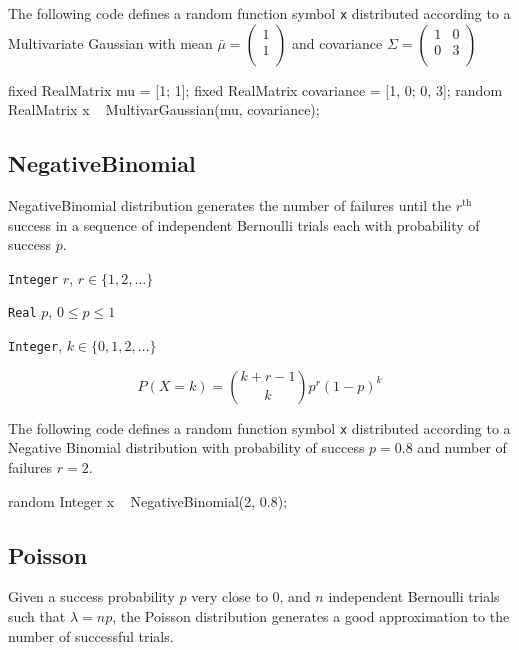 The following code defines a random function symbol \verb|x| distributed according to a Multivariate Gaussian with mean $\bar{\mu} = 
\begin{pmatrix}
  1  \\
  1  \\ 
 \end{pmatrix}$ and covariance $\Sigma = 
 \begin{pmatrix}
   1 & 0 \\
   0 & 3 \\
  \end{pmatrix}
 $
\begin{blogcode}
fixed RealMatrix mu = [1; 1];
fixed RealMatrix covariance = [1, 0; 0, 3];
random RealMatrix x ~ MultivarGaussian(mu, covariance);
\end{blogcode}

\subsection{NegativeBinomial}
NegativeBinomial distribution generates the number of failures until the $r^{\text{th}}$ success in a sequence of independent Bernoulli trials each with probability of success $p$.

\begin{itemize*}
\item[] \verb|Integer| $r$, $r \in \{1, 2, \ldots \}$
\item[] \verb|Real| $p$, $0 \leq p \leq 1$ 
\end{itemize*}

\begin{itemize*}
\item[] \verb|Integer|, $k \in \{0, 1, 2, \ldots \}$ 
\end{itemize*}

\[
	P(X = k) = \binom{k + r - 1}{k} p^{r} (1-p)^{k} 
\]

The following code defines a random function symbol \verb|x| distributed according to a Negative Binomial distribution with probability of success $p = 0.8$ and number of failures $r = 2$.
\begin{blogcode}
random Integer x ~ NegativeBinomial(2, 0.8);
\end{blogcode}


\subsection{Poisson}
Given a success probability $p$ very close to $0$, and $n$ independent Bernoulli trials such that $\lambda = np$, the Poisson distribution generates a good approximation to the number of successful trials.

